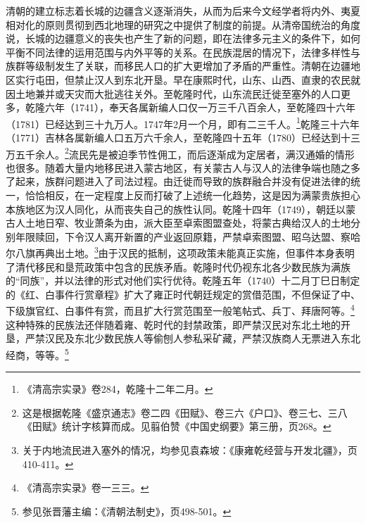 \documentclass[a4paper, 12pt, openright]{ctexbook}
\begin{document}
清朝的建立标志着长城的边疆含义逐渐消失，从而为后来今文经学者将内外、夷夏相对化的原则贯彻到西北地理的研究之中提供了制度的前提。从清帝国统治的角度说，长城的边疆意义的丧失也产生了新的问题，即在法律多元主义的条件下，如何平衡不同法律的运用范围与内外平等的关系。在民族混居的情况下，法律多样性与族群等级制发生了关联，而移民人口的扩大更增加了矛盾的严重性。清朝在边疆地区实行屯田，但禁止汉人到东北开垦。早在康熙时代，山东、山西、直隶的农民就因土地兼并或天灾而大批逃往关外。至乾隆时代，山东流民迁徙至塞外的人口更多，乾隆六年（1741），奉天各属新编人口仅一万三千八百余人，至乾隆四十六年（1781）已经达到三十九万人。1747年2月一个月，即有二三千人。\footnote{《清高宗实录》卷284，乾隆十二年二月。}乾隆三十六年（1771）吉林各属新编人口五万六千余人，至乾隆四十五年（1780）已经达到十三万五千余人。\footnote{这是根据乾隆《盛京通志》卷二四《田赋》、卷三六《户口》、卷三七、三八《田赋》统计字核算而成。见翦伯赞《中国史纲要》第三册，页268。}流民先是被迫季节性佣工，而后逐渐成为定居者，满汉通婚的情形也很多。随着大量内地移民进入蒙古地区，有关蒙古人与汉人的法律争端也随之多了起来，族群问题进入了司法过程。由迁徙而导致的族群融合并没有促进法律的统一，恰恰相反，在一定程度上反而打破了上述统一化趋势，这是因为满蒙贵族担心本族地区为汉人同化，从而丧失自己的族性认同。乾隆十四年（1749），朝廷以蒙古人土地日窄、牧业萧条为由，派大臣至卓索图盟查处，将蒙古典给汉人的土地分别年限赎回，下令汉人离开新置的产业返回原籍，严禁卓索图盟、昭乌达盟、察哈尔八旗再典出土地。\footnote{关于内地流民进入塞外的情况，均参见袁森坡：《康雍乾经营与开发北疆》，页410-411。}由于汉民的抵制，这项政策未能真正实施，但事件本身表明了清代移民和垦荒政策中包含的民族矛盾。乾隆时代仍视东北各少数民族为满族的“同族”，并以法律的形式对他们实行优待。乾隆五年（1740）十二月丁巳日制定的《红、白事件行赏章程》扩大了雍正时代朝廷规定的赏借范围，不但保证了中、下级旗官红、白事件有赏，而且扩大行赏范围至一般笔帖式、兵丁、拜唐阿等。\footnote{《清高宗实录》卷一三三。}这种特殊的民族法还伴随着雍、乾时代的封禁政策，即严禁汉民对东北土地的开垦，严禁汉民及东北少数民族人等偷刨人参私采矿藏，严禁汉族商人无票进入东北经商，等等。\footnote{参见张晋藩主编：《清朝法制史》，页498-501。}
\end{document}
